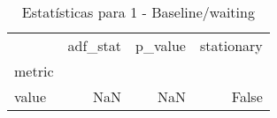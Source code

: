 \begin{table}[htbp]
\caption{Estatísticas para 1 - Baseline/waiting}
\label{tab:1_-_baseline_waiting_adf_test}
\begin{tabular}{lrrr}
\toprule
 & adf_stat & p_value & stationary \\
metric &  &  &  \\
\midrule
value & NaN & NaN & False \\
\bottomrule
\end{tabular}
\end{table}
